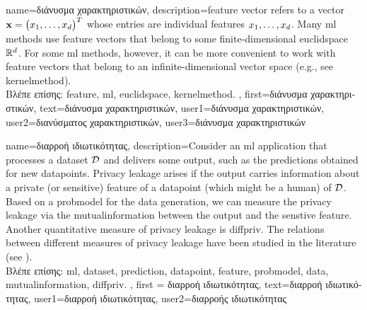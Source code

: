 {name={\foreignlanguage{greek}{διάνυσμα χαρακτηριστικών}},
	description={\Gls{feature} vector refers to a vector ${\bf x} = \big(x_{1},\ldots,x_{d}\big)^{T}$ 
	whose entries are individual \gls{feature}s $x_{1},\ldots,x_{d}$. Many \gls{ml} methods 
	use \gls{feature} vectors that belong to some finite-dimensional \gls{euclidspace} $\mathbb{R}^{d}$. 
	For some \gls{ml} methods, however, it can be more convenient to work with \gls{feature} 
	vectors that belong to an infinite-dimensional vector space (e.g., see \gls{kernelmethod}).\\
	\foreignlanguage{greek}{Βλέπε επίσης:} \gls{feature}, \gls{ml}, \gls{euclidspace}, \gls{kernelmethod}.
		}, first={\foreignlanguage{greek}{διάνυσμα χαρακτηριστικών}},
		text={\foreignlanguage{greek}{διάνυσμα χαρακτηριστικών}},
		user1={\foreignlanguage{greek}{διάνυσμα χαρακτηριστικών}}, %
  		user2={\foreignlanguage{greek}{διανύσματος χαρακτηριστικών}}, %
		user3={\foreignlanguage{greek}{διάνυσμα χαρακτηριστικών}} %
}

{
	name={\foreignlanguage{greek}{διαρροή ιδιωτικότητας}},
	description={Consider an \gls{ml} application that processes a 
	\gls{dataset} $\mathcal{D}$ and delivers some output, such as the \gls{prediction}s 
	obtained for new \gls{datapoint}s. Privacy leakage arises 
	if the output carries information about a private (or sensitive) \gls{feature} of 
	a \gls{datapoint} (which might be a human) of $\mathcal{D}$. Based on a \gls{probmodel} 
	for the \gls{data} generation, we can measure the privacy leakage via the \gls{mutualinformation} 
	between the output and the senstive \gls{feature}. Another quantitative measure of privacy leakage 
	is \gls{diffpriv}. The relations between different measures of privacy leakage have been 
	studied in the literature (see \cite{InfThDiffPriv}).\\
	\foreignlanguage{greek}{Βλέπε επίσης:} \gls{ml}, \gls{dataset}, \gls{prediction}, \gls{datapoint}, \gls{feature}, \gls{probmodel}, \gls{data}, \gls{mutualinformation}, \gls{diffpriv}. 
	}, 
	first = {\foreignlanguage{greek}{διαρροή ιδιωτικότητας}}, 
	text={\foreignlanguage{greek}{διαρροή ιδιωτικότητας}},
	user1={\foreignlanguage{greek}{διαρροή ιδιωτικότητας}}, %
   	user2={\foreignlanguage{greek}{διαρροής ιδιωτικότητας}} %
}

